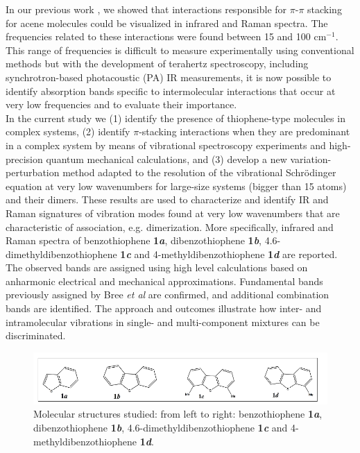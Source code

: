 	In our previous work \cite{spillebout2014discerning}, we showed that interactions responsible for $\pi$-$\pi$ stacking for acene molecules could be visualized in infrared and Raman spectra. The frequencies related to these interactions were found between 15 and 100 cm$^{-1}$. This range of frequencies is difficult to measure experimentally using conventional methods but with the development of terahertz spectroscopy, including synchrotron-based photacoustic (PA) IR measurements, it is now possible to identify absorption bands specific to intermolecular interactions that occur at very low frequencies and to evaluate their importance.\\
	
	In the current study we (1) identify the presence of thiophene-type molecules in complex systems, (2) identify $\pi$-stacking interactions when they are predominant in a complex system by means of vibrational spectroscopy experiments and high-precision quantum mechanical calculations, and (3) develop a new variation-perturbation method adapted to the resolution of the vibrational Schrödinger equation at very low wavenumbers for large-size systems (bigger than 15 atoms) and their dimers. These results are used to characterize and identify IR and Raman signatures of vibration modes found at very low wavenumbers that are characteristic of association, e.g. dimerization. More specifically, infrared and Raman spectra of benzothiophene \textbf{1\textit{a}}, dibenzothiophene \textbf{1\textit{b}}, 4.6-dimethyldibenzothiophene \textbf{1\textit{c}} and 4-methyldibenzothiophene \textbf{1\textit{d}} are reported. The observed bands are assigned using high level calculations based on anharmonic electrical and mechanical approximations. Fundamental bands previously assigned by Bree \textit{et al} \cite{bree1971vibrations} are confirmed, and additional combination bands are identified. The approach and outcomes illustrate how inter- and intramolecular vibrations in single- and multi-component mixtures can be discriminated.
	
	\begin{figure}[H]
		\centering
		\includegraphics[scale=0.7]{image/image/P1-F1}
		\caption{Molecular structures studied:  from left to right: benzothiophene \textbf{1\textit{a}}, dibenzothiophene \textbf{1\textit{b}}, 4.6-dimethyldibenzothiophene \textbf{1\textit{c}} and 4-methyldibenzothiophene \textbf{1\textit{d}}.}
	\end{figure}
	
